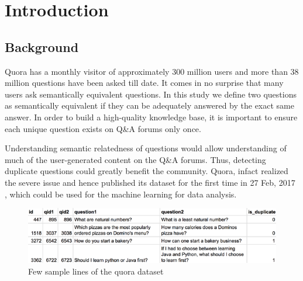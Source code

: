 

\KECloa %


\newpage
{} %

\chapter{Introduction}
\section{Background}\label{sec:bkgrnd}%
Quora has a monthly visitor of approximately 300 million users and more than 38 million questions have been asked till date\cite{Quora2018}. It comes in no surprise that many users ask semantically equivalent questions. In this study we define two questions as semantically equivalent if they can be adequately answered by the exact same answer. In order to build a high-quality knowledge base, it is important to ensure each unique question exists on Q\&A forums only once. 
\par
Understanding semantic relatedness of questions would allow understanding of much of the user-generated content on the Q\&A forums. Thus, detecting duplicate questions could greatly benefit the community. Quora, infact realized the severe issue and hence published its dataset for the first time in 27 Feb, 2017 \cite{QuoraEngineering}, which could be used for the machine learning for data analysis. 

\begin{figure}[tbh] %
\begin{center}
	\includegraphics[width = 5in]{images/questions.png}
	\caption{Few sample lines of the quora dataset} %
	\label{questions} %
\end{center}
\end{figure}

